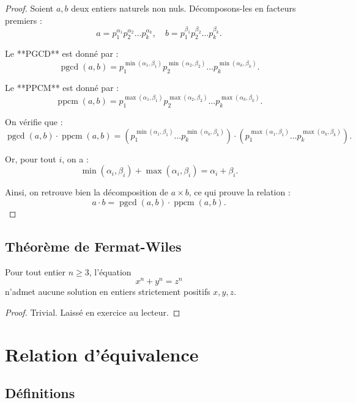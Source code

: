 \begin{proof}
    Soient \( a, b \) deux entiers naturels non nuls. Décomposons-les en facteurs premiers :
    \[
    a = p_1^{\alpha_1} p_2^{\alpha_2} \dots p_k^{\alpha_k}, \quad 
    b = p_1^{\beta_1} p_2^{\beta_2} \dots p_k^{\beta_k}.
    \]
    
    Le **PGCD** est donné par :
    \[
    \operatorname{pgcd}(a, b) = p_1^{\min(\alpha_1, \beta_1)} p_2^{\min(\alpha_2, \beta_2)} \dots p_k^{\min(\alpha_k, \beta_k)}.
    \]
    
    Le **PPCM** est donné par :
    \[
    \operatorname{ppcm}(a, b) = p_1^{\max(\alpha_1, \beta_1)} p_2^{\max(\alpha_2, \beta_2)} \dots p_k^{\max(\alpha_k, \beta_k)}.
    \]
    
    On vérifie que :
    \[
    \operatorname{pgcd}(a, b) \cdot \operatorname{ppcm}(a, b) = 
    \left( p_1^{\min(\alpha_1, \beta_1)} \dots p_k^{\min(\alpha_k, \beta_k)} \right)
    \cdot
    \left( p_1^{\max(\alpha_1, \beta_1)} \dots p_k^{\max(\alpha_k, \beta_k)} \right).
    \]
    
    Or, pour tout \( i \), on a :
    \[
    \min(\alpha_i, \beta_i) + \max(\alpha_i, \beta_i) = \alpha_i + \beta_i.
    \]
    
    Ainsi, on retrouve bien la décomposition de \( a \times b \), ce qui prouve la relation :
    \[
    a \cdot b = \operatorname{pgcd}(a, b) \cdot \operatorname{ppcm}(a, b).
    \]
\end{proof}
\subsection{Théorème de Fermat-Wiles }
\begin{theoreme}
Pour tout entier $n \geq 3$, l'équation
$$x^n + y^n = z^n$$
n'admet aucune solution en entiers strictement positifs $x, y, z$.
\end{theoreme}

\begin{proof}
Trivial. Laissé en exercice au lecteur.
\end{proof}


\section{Relation d'équivalence}
\subsection{Définitions}

